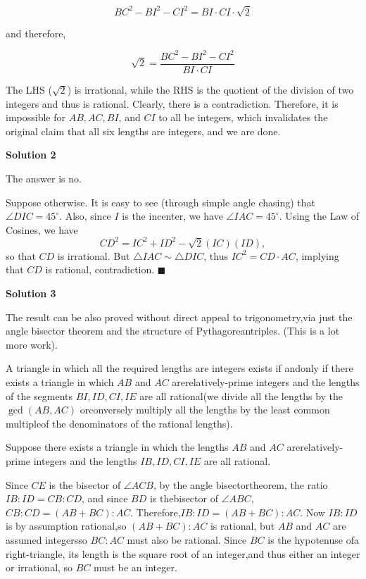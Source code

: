 \begin{enumerate}
 
 \[BC^2 - BI^2 - CI^2 = BI\cdot CI\cdot \sqrt{2}\]

 

 and therefore,

 
 \[\sqrt{2} = \frac{BC^2 - BI^2 - CI^2}{BI\cdot CI}\]

 

 The LHS ($\sqrt{2}$) is irrational, while the RHS is the quotient of the division of two integers and thus is rational. Clearly, there is a contradiction. Therefore, it is impossible for $AB, AC, BI$, and $CI$ to all be integers, which invalidates the original claim that all six lengths are integers, and we are done.

 



\textbf{Solution 2}

The answer is no.

 Suppose otherwise. It is easy to see (through simple angle chasing) that $\angle DIC=45^{\circ}$. Also, since $I$ is the incenter, we have $\angle IAC = 45^{\circ}$. Using the Law of Cosines, we have 
 \[CD^2=IC^2+ID^2-\sqrt{2}(IC)(ID),\] so that $CD$ is irrational. But $\triangle IAC \sim \triangle DIC$, thus $IC^2=CD\cdot AC$, implying that $CD$ is rational, contradiction. $\blacksquare$




\textbf{Solution 3}

The result can be also proved without direct appeal to trigonometry,via just the angle bisector theorem and the structure of Pythagoreantriples. (This is a lot more work).

 A triangle in which all the required lengths are integers exists if andonly if there exists a triangle in which $AB$ and $AC$ arerelatively-prime integers and the lengths of the segments $BI, ID, CI, IE$ are all rational(we divide all the lengths by the $\gcd(AB, AC)$ orconversely multiply all the lengths by the least common multipleof the denominators of the rational lengths).

 Suppose there exists a triangle in which the lengths $AB$ and $AC$ arerelatively-prime integers and the lengths $IB, ID, CI, IE$ are all rational.

 Since $CE$ is the bisector of $\angle ACB$, by the angle bisectortheorem, the ratio $IB : ID = CB : CD$, and since $BD$ is thebisector of $\angle ABC$, $CB : CD = (AB + BC) : AC$. Therefore,$IB : ID = (AB + BC) : AC$. Now $IB : ID$ is by assumption rational,so $(AB + BC) : AC$ is rational, but $AB$ and $AC$ are assumed integersso $BC : AC$ must also be rational. Since $BC$ is the hypotenuse ofa right-triangle, its length is the square root of an integer,and thus either an integer or irrational, so $BC$ must be an integer.


\end{enumerate}
